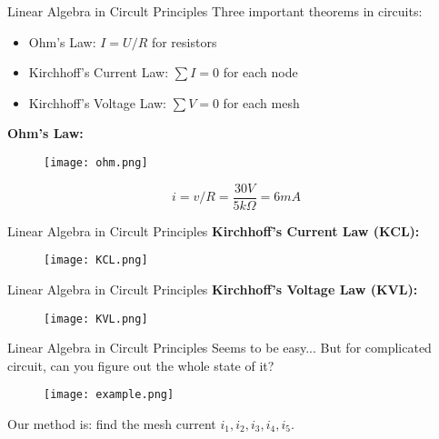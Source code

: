 \documentclass{beamer}
\begin{document}
\begin{frame}{Linear Algebra in Circult Principles}
Three important theorems in circuits:
\begin{itemize}
    \item Ohm's Law: $I=U/R$ for resistors
    \item Kirchhoff's Current Law: $\sum{I}=0$ for each node
    \item Kirchhoff's Voltage Law: $\sum{V}=0$ for each mesh
\end{itemize}

\textbf{Ohm's Law:}
\begin{figure}
    \centering
    \texttt{[image: ohm.png]}
\end{figure}

\begin{equation*}
    i=v/R=\frac{30V}{5k\Omega}=6mA
\end{equation*}
\end{frame}

\begin{frame}{Linear Algebra in Circult Principles}
\textbf{Kirchhoff's Current Law (KCL):}
\begin{figure}
    \centering
    \texttt{[image: KCL.png]}
\end{figure}
\end{frame}


\begin{frame}{Linear Algebra in Circult Principles}
    \textbf{Kirchhoff's Voltage Law (KVL):}
\begin{figure}
    \centering
    \texttt{[image: KVL.png]}
\end{figure}
\end{frame}

\begin{frame}{Linear Algebra in Circult Principles}
Seems to be easy... But for complicated circuit, can you figure out the whole state of it?

\begin{figure}
    \centering
    \texttt{[image: example.png]}
\end{figure}

Our method is: find the mesh current $i_1, i_2, i_3, i_4, i_5$.
\end{frame}
\end{document}
